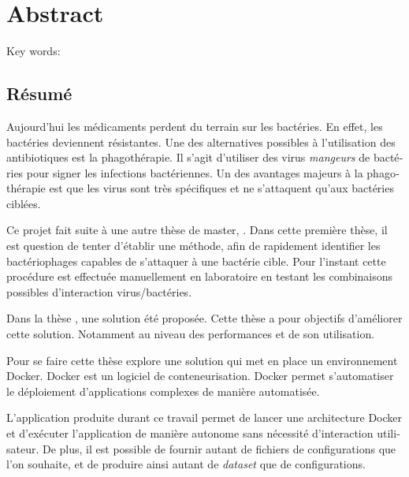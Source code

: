 

\cleardoublepage
\chapter*{Abstract}
\lipsum[1-2]
\vskip0.5cm
Key words: 


\begin{otherlanguage}{french}
\cleardoublepage
\chapter*{Résumé}

Aujourd'hui les médicaments perdent du terrain sur les bactéries. En effet, les bactéries deviennent résistantes. Une des alternatives possibles à l'utilisation des antibiotiques est la phagothérapie. Il s'agit d'utiliser des virus \emph{mangeurs} de bactéries pour signer les infections bactériennes. Un des avantages majeurs à la phagothérapie est que les virus sont très spécifiques et ne s'attaquent qu'aux bactéries ciblées. 

Ce projet fait suite à une autre thèse de master, \thLeite . Dans cette première thèse, il est question de tenter d'établir une méthode, afin de rapidement identifier les bactériophages capables de s'attaquer à une bactérie cible. Pour l'instant cette procédure est effectuée manuellement en laboratoire en testant les combinaisons possibles d'interaction virus/bactéries.

Dans la thèse \thLeite , une solution été proposée. Cette thèse a pour objectifs d'améliorer cette solution. Notamment au niveau des performances et de son utilisation.

Pour se faire cette thèse explore une solution qui met en place un environnement Docker. Docker est un logiciel de conteneurisation. Docker permet s'automatiser le déploiement d'applications complexes de manière automatisée.

L'application produite durant ce travail permet de lancer une architecture Docker et d'exécuter l'application de manière autonome sans nécessité d'interaction utilisateur. De plus, il est possible de fournir autant de fichiers de configurations que l'on souhaite, et de produire ainsi autant de \emph{dataset} que de configurations.

\end{otherlanguage}


